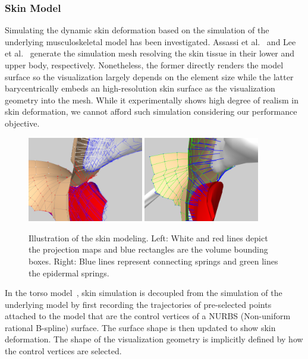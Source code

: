 \subsubsection{\textbf{Skin Model}}
\label{sec:skinmodel}
Simulating the dynamic skin deformation based on the simulation of the underlying musculoskeletal model has been investigated. Assassi et al.~\cite{Assassi:2012:dynamic} and Lee et al.~\cite{Lee:2009:CBM} generate the simulation mesh resolving the skin tissue in their lower and upper body, respectively. Nonetheless, the former directly renders the model surface so the visualization largely depends on the element size while the latter barycentrically embeds an high-resolution skin surface as the visualization geometry into the mesh. While it experimentally shows high degree of realism in skin deformation, we cannot afford such simulation considering our performance objective.
\begin{figure}
\begin{center}
\includegraphics[width=0.45\textwidth]{vriphys/closetpoint2}
\includegraphics[width=0.45\textwidth]{vriphys/skinmodel2}
\caption{\label{fig:skinmodel}
Illustration of the skin modeling. Left: White and red lines depict the projection maps and blue rectangles are the volume bounding boxes. Right: Blue lines represent connecting springs and green lines the epidermal springs.}
\end{center}
\end{figure}

In the torso model~\cite{Zordan:2004:breathe}, skin simulation is decoupled from the simulation of the underlying model by first recording the trajectories of pre-selected points attached to the model that are the control vertices of a NURBS (Non-uniform rational B-spline) surface. The surface shape is then updated to show skin deformation. The shape of the visualization geometry is implicitly defined by how the control vertices are selected.

